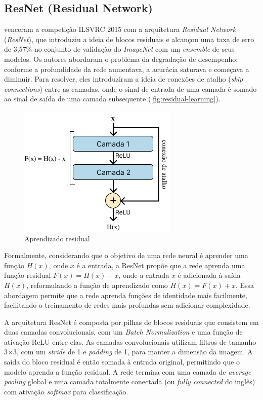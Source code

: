 \subsection{ResNet (Residual Network)}

\cite{He2016} venceram a competição ILSVRC 2015 com a arquitetura \textit{Residual Network} (\textit{ResNet}), que introduziu a ideia de blocos residuais e alcançou uma taxa de erro de 3,57\% no conjunto de validação do \textit{ImageNet} com um \textit{ensemble} de seus modelos. Os autores abordaram o problema da degradação de desempenho: conforme a profundidade da rede aumentava, a acurácia saturava e começava a diminuir. Para resolver, eles introduziram a ideia de conexões de atalho (\textit{skip connections}) entre as camadas, onde o sinal de entrada de uma camada é somado ao sinal de saída de uma camada subsequente (\autoref{fig:residual-learning}).

\begin{figure}[h]
    \centering
    \includegraphics[width=0.5\linewidth]{figs/residual-connection.png}
    \caption{Aprendizado residual}
    \label{fig:residual-learning}
\end{figure}

Formalmente, considerando que o objetivo de uma rede neural é aprender uma função \( H(x) \), onde \( x \) é a entrada, a ResNet propõe que a rede aprenda uma função residual \( F(x) = H(x) - x \), onde a entrada \( x \) é adicionada à saída \( H(x) \), reformulando a função de aprendizado como \( H(x) = F(x) + x \). Essa abordagem permite que a rede aprenda funções de identidade mais facilmente, facilitando o treinamento de redes mais profundas sem adicionar complexidade.

A arquitetura ResNet é composta por pilhas de blocos residuais que consistem em duas camadas convolucionais, com um \textit{Batch Normalization} e uma função de ativação ReLU entre elas. As camadas convolucionais utilizam filtros de tamanho 3×3, com um \textit{stride} de 1 e \textit{padding} de 1, para manter a dimensão da imagem. A saída do bloco residual é então somada à entrada original, permitindo que o modelo aprenda a função residual. A rede termina com uma camada de \textit{average pooling} global e uma camada totalmente conectada (ou \textit{fully connected} do inglês) com ativação \textit{softmax} para classificação.

